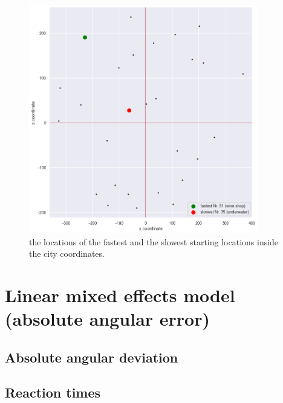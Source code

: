 \begin{figure}[h]
	\centering
	\includegraphics[width=100mm]{figures/fastest_slowest_starting_locations_RT.png}
	\caption[Locations of fastest and slowest starting locations in city]{the locations of the fastest and the slowest starting locations inside the city coordinates.}
	\label{fig:fastest_slowest_locs}
\end{figure}

\section{Linear mixed effects model (absolute angular error)}

\subsection{Absolute angular deviation}

\subsection{Reaction times}

